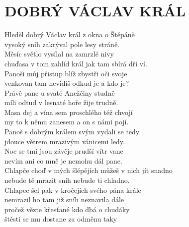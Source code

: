 \section*{\Huge DOBRÝ VÁCLAV KRÁL}

Hleděl dobrý Václav král z okna o Štěpáně\\
vysoký sníh zakrýval pole lesy stráně.\\
Měsíc světlo vysílal na zamrzlé nivy\\
chuďasa v tom zahlíd král jak tam sbírá dří \hspace{0,5cm} ví.\\

Panoši můj přistup blíž zbystři oči svoje\\
venkovan tam nevidíš odkud je a kdo je?\\
Právě pane u svaté Anežčiny studně\\
míli odtud v lesnaté hoře žije trudně.\\

Masa dej a vína sem proschlého též chvojí\\
my to k němu zanesem a on s námi pojí.\\
Panoš s dobrým králem svým vydali se tedy\\
jdouce větrem mrazivým vánicemi ledy.\\

Noc se tmí jsou závěje prudší vítr vane\\
nevím ani co mně je nemohu dál pane.\\
Chlapče choď v mých šlépějích můžeš v nich jít snadno\\
nebude tě mrazit sníh nebude ti chladno.\\

Chlapec šel pak v kročejích svého pána krále\\
nemrazil ho tam již sníh neznavila dále\\
pročež vězte křesťané kdo dbá o chudáky\\
štěstí se mu dostane za odměnu taky

\newpage
